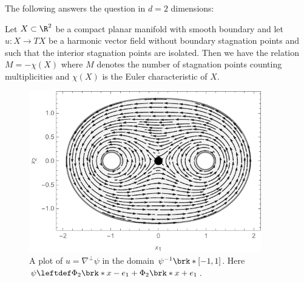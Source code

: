 \begin{frame}
  The following answers the question in $d=2$ dimensions:
  \begin{proposition}\label{pr:n2_hvf_noInflowNoOutflow}
    Let $X\subset\R^2$ be a compact planar manifold with smooth boundary
    and let $u\colon X\to TX$ be
    a harmonic vector field without boundary stagnation points and such that the interior stagnation points are isolated.
    Then we have the relation $M=-\chi(X)$ where $M$ denotes the number of stagnation points counting multiplicities and
    $\chi(X)$ is the Euler characteristic of $X$.
  \end{proposition}
\end{frame}

\begin{frame}
  \begin{figure}
    \centering
    \includegraphics[width=0.9\textwidth]{../Plots/n2_hvf_noInflowNoOutflow_symmetric_gray_2.pdf}
    \caption{A plot of $u=\nabla^\perp\psi$ in the domain $\psi^{-1}\brk*{[-1,1]}$.
      Here $\psi\leftdef\Phi_2\brk*{x-e_1}+\Phi_2\brk*{x+e_1}$.}
    \label{pl:n2_hvf_noInflowNoOutflow}
  \end{figure}
\end{frame}

